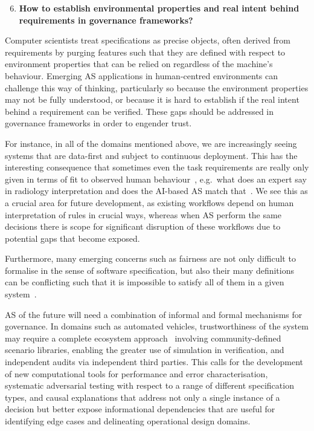\documentclass[sigconf,nonacm]{acmart}%
\begin{document}
	\begin{enumerate}[leftmargin=0.5cm]
		\setcounter{enumi}{5}
		\item \textbf{How to establish environmental properties and real intent behind requirements in governance frameworks?}
	\end{enumerate}
	Computer scientists treat specifications as precise objects, often derived from requirements by purging features such that they are defined with respect to environment properties that can be relied on regardless of the machine's behaviour. Emerging AS applications in human-centred environments can challenge this way of thinking, particularly so because the environment properties may not be fully understood, or because it is hard to establish if the real intent behind a requirement can be verified. These gaps should be addressed in governance frameworks in order to engender trust.
	
	For instance, in all of the domains mentioned above, we are increasingly seeing systems that are data-first and subject to continuous deployment. This has the interesting consequence that sometimes even the task requirements are really only given in terms of fit to observed human behaviour~\cite{topol2019high}, e.g.\ what does an expert say in radiology interpretation and does the AI-based AS match that~\cite{Freemann1872}. We see this as a crucial area for future development, as existing workflows depend on human interpretation of rules in crucial ways, whereas when AS perform the same decisions there is scope for significant disruption of these workflows due to potential gaps that become exposed.

	Furthermore, many emerging concerns such as fairness are not only difficult to formalise in the sense of software specification, but also their many definitions can be conflicting such that it is impossible to satisfy all of them in a given system~\cite{narayanan21fairness}. 
	
	AS of the future will need a combination of informal and formal mechanisms for governance. In domains such as automated vehicles, trustworthiness of the system may require a complete ecosystem approach~\cite{koopman2019certification} involving community-defined scenario libraries, enabling the greater use of simulation in verification, and independent audits via independent third parties. This calls for the development of new computational tools for performance and error characterisation, systematic adversarial testing with respect to a range of different specification types, and causal explanations that address not only a single instance of a decision but better expose informational dependencies that are useful for identifying edge cases and delineating operational design domains. 
	
\end{document}

